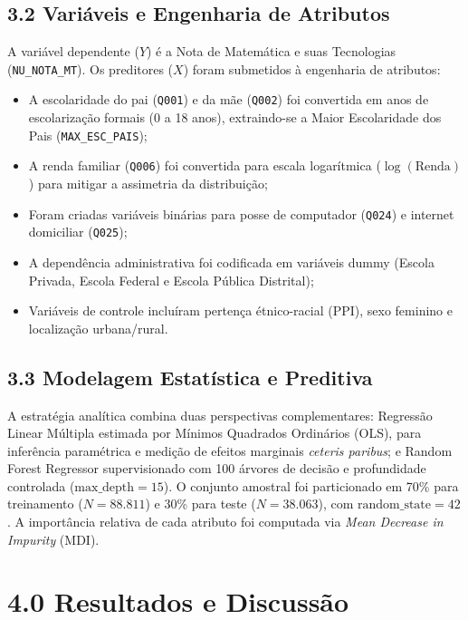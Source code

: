 \documentclass[twocolumn,10pt,a4paper]{article}
\begin{document}
\subsection*{3.2 Variáveis e Engenharia de Atributos}

A variável dependente ($Y$) é a Nota de Matemática e suas Tecnologias (\texttt{NU\_NOTA\_MT}). Os preditores ($X$) foram submetidos à engenharia de atributos:
\begin{itemize}
  \item A escolaridade do pai (\texttt{Q001}) e da mãe (\texttt{Q002}) foi convertida em anos de escolarização formais (0 a 18 anos), extraindo-se a Maior Escolaridade dos Pais (\texttt{MAX\_ESC\_PAIS});
  \item A renda familiar (\texttt{Q006}) foi convertida para escala logarítmica ($\log(\text{Renda})$) para mitigar a assimetria da distribuição;
  \item Foram criadas variáveis binárias para posse de computador (\texttt{Q024}) e internet domiciliar (\texttt{Q025});
  \item A dependência administrativa foi codificada em variáveis dummy (Escola Privada, Escola Federal e Escola Pública Distrital);
  \item Variáveis de controle incluíram pertença étnico-racial (PPI), sexo feminino e localização urbana/rural.
\end{itemize}

\subsection*{3.3 Modelagem Estatística e Preditiva}

A estratégia analítica combina duas perspectivas complementares: Regressão Linear Múltipla estimada por Mínimos Quadrados Ordinários (OLS), para inferência paramétrica e medição de efeitos marginais \textit{ceteris paribus}; e Random Forest Regressor supervisionado com 100 árvores de decisão e profundidade controlada ($\text{max\_depth} = 15$). O conjunto amostral foi particionado em 70\% para treinamento ($N = 88.811$) e 30\% para teste ($N = 38.063$), com $\text{random\_state} = 42$. A importância relativa de cada atributo foi computada via \textit{Mean Decrease in Impurity} (MDI).

\section*{4.0 Resultados e Discussão}
\end{document}
